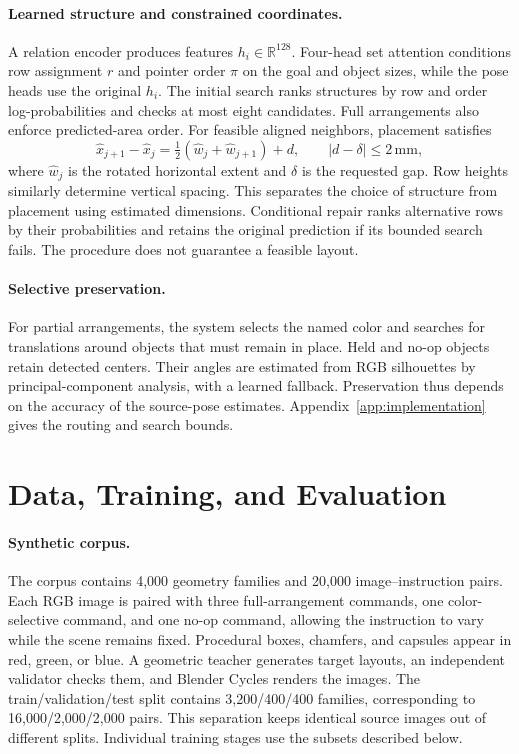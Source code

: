 \documentclass{article}
\begin{document}
\paragraph{Learned structure and constrained coordinates.}
A relation encoder produces features $h_i\in\mathbb R^{128}$. Four-head set attention conditions row assignment $r$ and pointer order $\pi$ on the goal and object sizes, while the pose heads use the original $h_i$. The initial search ranks structures by row and order log-probabilities and checks at most eight candidates. Full arrangements also enforce predicted-area order. For feasible aligned neighbors, placement satisfies
\begin{equation}\label{eq:mainspacing}
 \hat x_{j+1}-\hat x_j=\tfrac12(\hat w_j+\hat w_{j+1})+d,\qquad |d-\delta|\leq2\,\mathrm{mm},
\end{equation}
where $\hat w_j$ is the rotated horizontal extent and $\delta$ is the requested gap. Row heights similarly determine vertical spacing. This separates the choice of structure from placement using estimated dimensions. Conditional repair ranks alternative rows by their probabilities and retains the original prediction if its bounded search fails. The procedure does not guarantee a feasible layout.

\paragraph{Selective preservation.}
For partial arrangements, the system selects the named color and searches for translations around objects that must remain in place. Held and no-op objects retain detected centers. Their angles are estimated from RGB silhouettes by principal-component analysis, with a learned fallback. Preservation thus depends on the accuracy of the source-pose estimates. Appendix~\ref{app:implementation} gives the routing and search bounds.

\section{Data, Training, and Evaluation}
\label{sec:protocol}
\paragraph{Synthetic corpus.}
The corpus contains 4,000 geometry families and 20,000 image--instruction pairs. Each RGB image is paired with three full-arrangement commands, one color-selective command, and one no-op command, allowing the instruction to vary while the scene remains fixed. Procedural boxes, chamfers, and capsules appear in red, green, or blue. A geometric teacher generates target layouts, an independent validator checks them, and Blender Cycles renders the images. The train/validation/test split contains 3,200/400/400 families, corresponding to 16,000/2,000/2,000 pairs. This separation keeps identical source images out of different splits. Individual training stages use the subsets described below.
\end{document}
